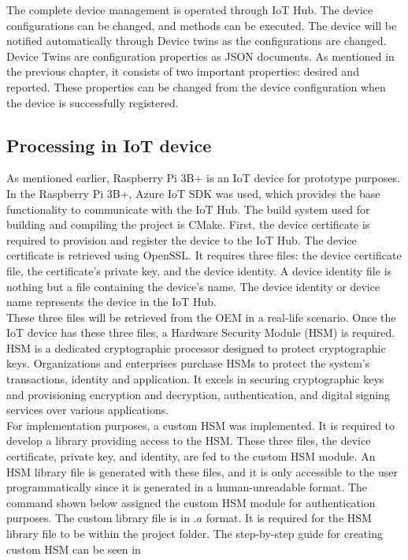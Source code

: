 \documentclass[12pt,a4paper]{article}
\begin{document}
{The complete device management is operated through IoT Hub. The device configurations can be changed, and methods can be executed. The device will be notified automatically through Device twins as the configurations are changed. Device Twins are configuration properties as JSON documents. As mentioned in the previous chapter, it consists of two important properties: desired and reported. These properties can be changed from the device configuration when the device is successfully registered. \\


\subsection{Processing in IoT device}

As mentioned earlier, Raspberry Pi 3B+ is an IoT device for prototype purposes. In the Raspberry Pi 3B+, Azure IoT SDK was used, which provides the base functionality to communicate with the IoT Hub. The build system used for building and compiling the project is CMake. First, the device certificate is required to provision and register the device to the IoT Hub. The device certificate is retrieved using OpenSSL. It requires three files: the device certificate file, the certificate's private key, and the device identity. A device identity file is nothing but a file containing the device's name. The device identity or device name represents the device in the IoT Hub. \\

These three files will be retrieved from the OEM in a real-life scenario. Once the IoT device has these three files, a Hardware Security Module (HSM) is required. HSM is a dedicated cryptographic processor designed to protect cryptographic keys. Organizations and enterprises purchase HSMs to protect the system's transactions, identity and application. It excels in securing cryptographic keys and provisioning encryption and decryption, authentication, and digital signing services over various applications. \cite{r46} \\

For implementation purposes, a custom HSM was implemented. It is required to develop a library providing access to the HSM. These three files, the device certificate, private key, and identity, are fed to the custom HSM module. An HSM library file is generated with these files, and it is only accessible to the user programmatically since it is generated in a human-unreadable format. The command shown below assigned the custom HSM module for authentication purposes. The custom library file is in $.a$ format. It is required for the HSM library file to be within the project folder. The step-by-step guide for creating custom HSM can be seen in \cite{r47}

}
\end{document}
